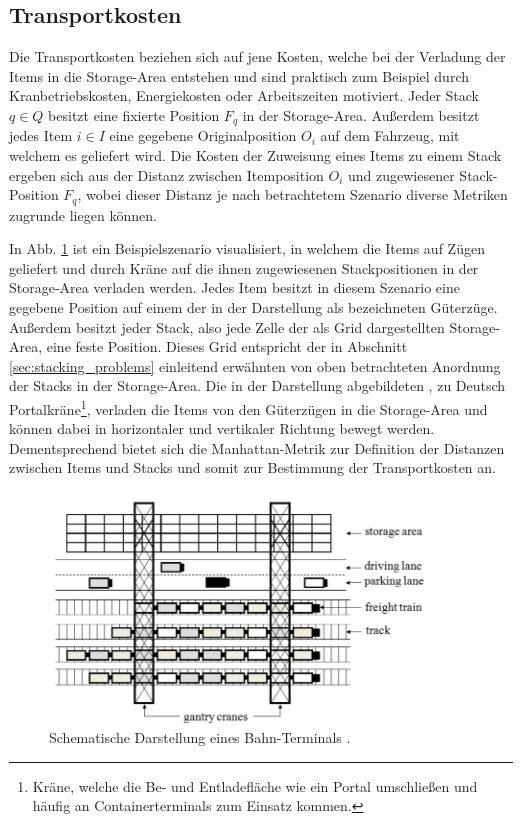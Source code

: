 \vfill

\pagebreak

\subsection{Transportkosten}
\label{sec:transport_costs}
Die Transportkosten beziehen sich auf jene Kosten, welche bei der Verladung der Items in die Storage-Area entstehen
und sind praktisch zum Beispiel durch Kranbetriebskosten, Energiekosten oder Arbeitszeiten motiviert.\newline
Jeder Stack $q \in Q$ besitzt eine fixierte Position $F_q$ in der Storage-Area.
Außerdem besitzt jedes Item $i \in I$ eine gegebene Originalposition $O_i$ auf dem Fahrzeug, mit welchem es geliefert wird.
Die Kosten der Zuweisung eines Items zu einem Stack ergeben sich aus der Distanz zwischen Itemposition $O_i$ und
zugewiesener Stack-Position $F_q$, wobei dieser Distanz je nach betrachtetem Szenario diverse Metriken zugrunde liegen können.

In Abb. \ref{fig:costs} ist ein Beispielszenario visualisiert, in welchem die Items auf Zügen geliefert und durch Kräne auf die ihnen zugewiesenen Stackpositionen in der Storage-Area verladen werden.
Jedes Item besitzt in diesem Szenario eine gegebene Position auf einem der in der Darstellung als  bezeichneten Güterzüge. Außerdem besitzt jeder Stack, also jede Zelle der als Grid dargestellten Storage-Area,
eine feste Position. Dieses Grid entspricht der in Abschnitt \ref{sec:stacking_problems} einleitend erwähnten
von oben betrachteten Anordnung der Stacks in der Storage-Area.
Die in der Darstellung abgebildeten , zu Deutsch
Portalkräne\footnote{Kräne, welche die Be- und Entladefläche wie ein Portal umschließen und häufig an
Containerterminals zum Einsatz kommen.}, verladen die Items von den Güterzügen in die
Storage-Area und können dabei in horizontaler und vertikaler Richtung bewegt werden. Dementsprechend bietet sich die Manhattan-Metrik zur Definition der Distanzen zwischen Items und Stacks und somit zur Bestimmung der Transportkosten an.

\begin{figure}[H]
\includegraphics[width=0.9\textwidth]{img/costs.png}
\caption{Schematische Darstellung eines Bahn-Terminals \cite{Briskorn2018}.}
\label{fig:costs}
\end{figure}

